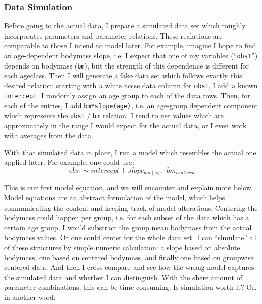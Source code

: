 \subsubsection{Data Simulation}
\label{sec:org2c774e4}
Before going to the actual data, I prepare a simulated data set which roughly incorporates parameters and parameter relations.
These realations are comparable to those I intend to model later.
For example, imagine I hope to find an age-dependent bodymass slope, i.e. I expect that one of my variables (``\texttt{obs1}'') depends on bodymass (\texttt{bm}), but the strength of this dependence is different for each ageclass.
Then I will generate a fake data set which follows exactly this desired relation: starting with a white noise data column for \texttt{obs1}, I add a known \texttt{intercept}.
I randomly assign an age group to each of the data rows.
Then, for each of the entries, I add \texttt{bm*slope(age)}, i.e. an age-group dependent component which represents the \texttt{obs1} / \texttt{bm} relation.
I tend to use values which are approximately in the range I would expect for the actual data, or I even work with averages from the data.

With that simulated data in place, I run a model which resembles the actual one applied later.
For example, one could use:
\begin{equation} obs_{1} \sim intercept + slope_{bm\mid age} \cdot bm_{centered} \label{eq:exampleformula} \end{equation}

This is our first model equation, and we will encounter and explain more below.
Model equations are an abstract formulation of the model, which helps communicating the content and keeping track of model alterations.
Centering the bodymass could happen per group, i.e. for each subset of the data which has a certain age group, I would substract the group mean bodymass from the actual bodymass values.
Or one could center for the whole data set.
I can ``simulate'' all of these structures by simple numeric calculation: a slope based on absolute bodymass, one based on centered bodymass, and finally one based on groupwise centered data.
And then I cross compare and see how the wrong model captures the simulated data and whether I can distinguish.
With the shere amount of parameter combinations, this can be time consuming.
Is simulation worth it? Or, in another word:

